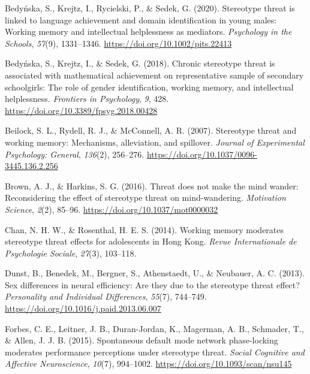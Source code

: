 \documentclass[
  doc, a4paper]{apa7}
\newlength{\cslhangindent}
\newenvironment{CSLReferences}[2] %
 {\begin{list}{}{%
  \setlength{\itemindent}{0pt}
  \setlength{\leftmargin}{0pt}
  \setlength{\parsep}{0pt}
  \ifodd #1
   \setlength{\leftmargin}{\cslhangindent}
   \setlength{\itemindent}{-1\cslhangindent}
  \fi
  \setlength{\itemsep}{#2\baselineskip}}}
 {\end{list}}
\begin{document}
\label{refs}
\begin{CSLReferences}{1}{0}
Bedyńska, S., Krejtz, I., Rycielski, P., \& Sedek, G. (2020). Stereotype threat is linked to language achievement and domain identification in young males: {Working} memory and intellectual helplessness as mediators. \emph{Psychology in the Schools}, \emph{57}(9), 1331--1346. \url{https://doi.org/10.1002/pits.22413}

Bedyńska, S., Krejtz, I., \& Sedek, G. (2018). Chronic stereotype threat is associated with mathematical achievement on representative sample of secondary schoolgirls: {The} role of gender identification, working memory, and intellectual helplessness. \emph{Frontiers in Psychology}, \emph{9}, 428. \url{https://doi.org/10.3389/fpsyg.2018.00428}

Beilock, S. L., Rydell, R. J., \& McConnell, A. R. (2007). Stereotype threat and working memory: {Mechanisms}, alleviation, and spillover. \emph{Journal of Experimental Psychology: General}, \emph{136}(2), 256--276. \url{https://doi.org/10.1037/0096-3445.136.2.256}

Brown, A. J., \& Harkins, S. G. (2016). Threat does not make the mind wander: {Reconsidering} the effect of stereotype threat on mind-wandering. \emph{Motivation Science}, \emph{2}(2), 85--96. \url{https://doi.org/10.1037/mot0000032}

Chan, N. H. W., \& Rosenthal, H. E. S. (2014). Working memory moderates stereotype threat effects for adolescents in {Hong Kong}. \emph{Revue Internationale de Psychologie Sociale}, \emph{27}(3), 103--118.

Dunst, B., Benedek, M., Bergner, S., Athenstaedt, U., \& Neubauer, A. C. (2013). Sex differences in neural efficiency: {Are} they due to the stereotype threat effect? \emph{Personality and Individual Differences}, \emph{55}(7), 744--749. \url{https://doi.org/10.1016/j.paid.2013.06.007}

Forbes, C. E., Leitner, J. B., Duran-Jordan, K., Magerman, A. B., Schmader, T., \& Allen, J. J. B. (2015). Spontaneous default mode network phase-locking moderates performance perceptions under stereotype threat. \emph{Social Cognitive and Affective Neuroscience}, \emph{10}(7), 994--1002. \url{https://doi.org/10.1093/scan/nsu145}


\end{CSLReferences}
\end{document}
